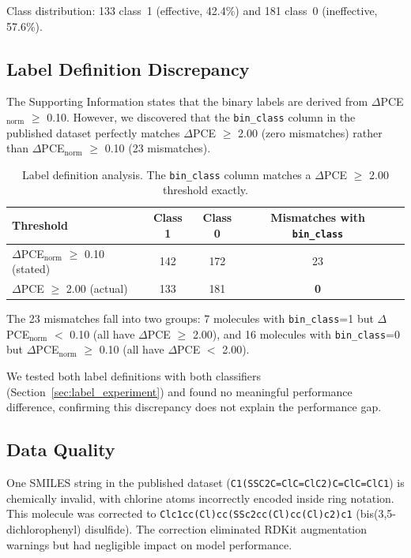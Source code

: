 \documentclass[11pt,a4paper]{article}
\begin{document}
Class distribution: 133 class~1 (effective, 42.4\%) and 181 class~0 (ineffective, 57.6\%).

\subsection{Label Definition Discrepancy}
\label{sec:labels}

The Supporting Information states that the binary labels are derived from $\Delta$PCE$_{\text{norm}}$ $\geq$ 0.10. However, we discovered that the \texttt{bin\_class} column in the published dataset perfectly matches $\Delta$PCE $\geq$ 2.00 (zero mismatches) rather than $\Delta$PCE$_{\text{norm}}$ $\geq$ 0.10 (23 mismatches).

\begin{table}[H]
\centering
\caption{Label definition analysis. The \texttt{bin\_class} column matches a $\Delta$PCE $\geq$ 2.00 threshold exactly.}
\label{tab:labels}
\begin{tabular}{lcccc}
\toprule
Threshold & Class 1 & Class 0 & Mismatches with \texttt{bin\_class} \\
\midrule
$\Delta$PCE$_{\text{norm}}$ $\geq$ 0.10 (stated) & 142 & 172 & 23 \\
$\Delta$PCE $\geq$ 2.00 (actual) & 133 & 181 & \textbf{0} \\
\bottomrule
\end{tabular}
\end{table}

The 23 mismatches fall into two groups: 7 molecules with \texttt{bin\_class}=1 but $\Delta$PCE$_{\text{norm}}$ $<$ 0.10 (all have $\Delta$PCE $\geq$ 2.00), and 16 molecules with \texttt{bin\_class}=0 but $\Delta$PCE$_{\text{norm}}$ $\geq$ 0.10 (all have $\Delta$PCE $<$ 2.00).

We tested both label definitions with both classifiers (Section~\ref{sec:label_experiment}) and found no meaningful performance difference, confirming this discrepancy does not explain the performance gap.

\subsection{Data Quality}

One SMILES string in the published dataset (\texttt{C1(SSC2C=ClC=ClC2)C=ClC=ClC1}) is chemically invalid, with chlorine atoms incorrectly encoded inside ring notation. This molecule was corrected to \texttt{Clc1cc(Cl)cc(SSc2cc(Cl)cc(Cl)c2)c1} (bis(3,5-dichlorophenyl) disulfide). The correction eliminated RDKit augmentation warnings but had negligible impact on model performance.
\end{document}
